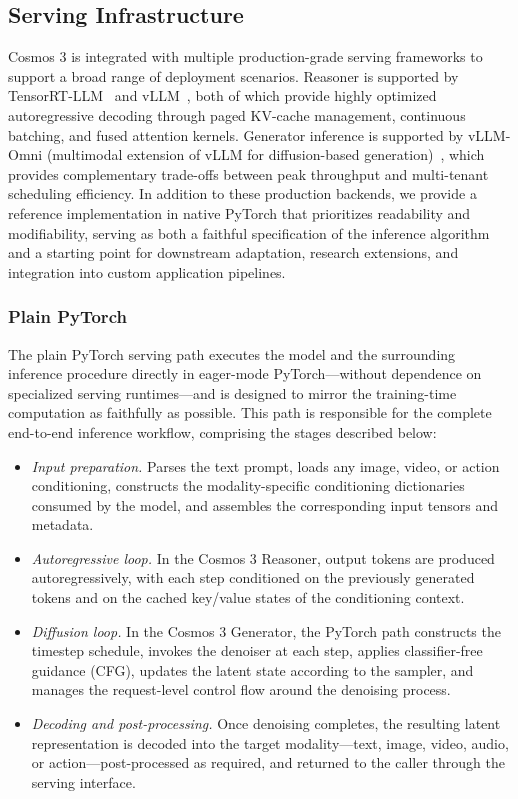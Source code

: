 \subsection{Serving Infrastructure}
\label{subsec::serving_infrastructure}

Cosmos 3 is integrated with multiple production-grade serving frameworks to support a broad range of deployment scenarios. Reasoner is supported by TensorRT-LLM~\citep{trtllm} and vLLM~\citep{vllm}, both of which provide highly optimized autoregressive decoding through paged KV-cache management, continuous batching, and fused attention kernels. Generator inference is supported by vLLM-Omni (multimodal extension of vLLM for diffusion-based generation)~\citep{vllm_omni}, which provides complementary trade-offs between peak throughput and multi-tenant scheduling efficiency. In addition to these production backends, we provide a reference implementation in native PyTorch that prioritizes readability and modifiability, serving as both a faithful specification of the inference algorithm and a starting point for downstream adaptation, research extensions, and integration into custom application pipelines.

\subsubsection{Plain PyTorch}

The plain PyTorch serving path executes the model and the surrounding inference procedure directly in eager-mode PyTorch---without dependence on specialized serving runtimes---and is designed to mirror the training-time computation as faithfully as possible. This path is responsible for the complete end-to-end inference workflow, comprising the stages described below:

\begin{itemize}

\item \textit{Input preparation.} Parses the text prompt, loads any image, video, or action conditioning, constructs the modality-specific conditioning dictionaries consumed by the model, and assembles the corresponding input tensors and metadata.
\item \textit{Autoregressive loop.} In the Cosmos 3 Reasoner, output tokens are produced autoregressively, with each step conditioned on the previously generated tokens and on the cached key/value states of the conditioning context.
\item \textit{Diffusion loop.} In the Cosmos 3 Generator, the PyTorch path constructs the timestep schedule, invokes the denoiser at each step, applies classifier-free guidance (CFG), updates the latent state according to the sampler, and manages the request-level control flow around the denoising process.
\item \textit{Decoding and post-processing.} Once denoising completes, the resulting latent representation is decoded into the target modality---text, image, video, audio, or action---post-processed as required, and returned to the caller through the serving interface.

\end{itemize}

